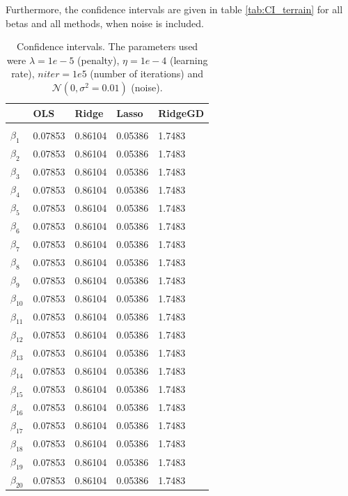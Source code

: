Furthermore, the confidence intervals are given in table \eqref{tab:CI_terrain} for all betas and all methods, when noise is included.

\begin{table} [H]
	\caption{Confidence intervals. The parameters used were $\lambda=1e-5$ (penalty), $\eta=1e-4$ (learning rate), $niter=1e5$ (number of iterations) and $\mathcal{N}(0, \sigma^2=0.01)$ (noise).  \vspace{2mm}}
	\begin{tabularx}{\textwidth}{l|XXXX} \hline\hline
		\label{tab:CI_terrain}
		&\textbf{OLS}&\textbf{Ridge}&\textbf{Lasso}&\textbf{RidgeGD}\\ \hline \\
		$\beta_1$ & 0.07853 & 0.86104 & 0.05386 & 1.7483\\
		$\beta_2$ & 0.07853 & 0.86104 & 0.05386 & 1.7483\\
		$\beta_3$ & 0.07853 & 0.86104 & 0.05386 & 1.7483\\
		$\beta_4$ & 0.07853 & 0.86104 & 0.05386 & 1.7483\\
		$\beta_5$ & 0.07853 & 0.86104 & 0.05386 & 1.7483\\
		$\beta_6$ & 0.07853 & 0.86104 & 0.05386 & 1.7483\\
		$\beta_7$ & 0.07853 & 0.86104 & 0.05386 & 1.7483\\
		$\beta_8$ & 0.07853 & 0.86104 & 0.05386 & 1.7483\\
		$\beta_9$ & 0.07853 & 0.86104 & 0.05386 & 1.7483\\
		$\beta_{10}$ & 0.07853 & 0.86104 & 0.05386 & 1.7483\\
		$\beta_{11}$ & 0.07853 & 0.86104 & 0.05386 & 1.7483\\
		$\beta_{12}$ & 0.07853 & 0.86104 & 0.05386 & 1.7483\\
		$\beta_{13}$ & 0.07853 & 0.86104 & 0.05386 & 1.7483\\
		$\beta_{14}$ & 0.07853 & 0.86104 & 0.05386 & 1.7483\\
		$\beta_{15}$ & 0.07853 & 0.86104 & 0.05386 & 1.7483\\
		$\beta_{16}$ & 0.07853 & 0.86104 & 0.05386 & 1.7483\\
		$\beta_{17}$ & 0.07853 & 0.86104 & 0.05386 & 1.7483\\
		$\beta_{18}$ & 0.07853 & 0.86104 & 0.05386 & 1.7483\\
		$\beta_{19}$ & 0.07853 & 0.86104 & 0.05386 & 1.7483\\
		$\beta_{20}$ & 0.07853 & 0.86104 & 0.05386 & 1.7483\\

\end{tabularx}
\end{table}
